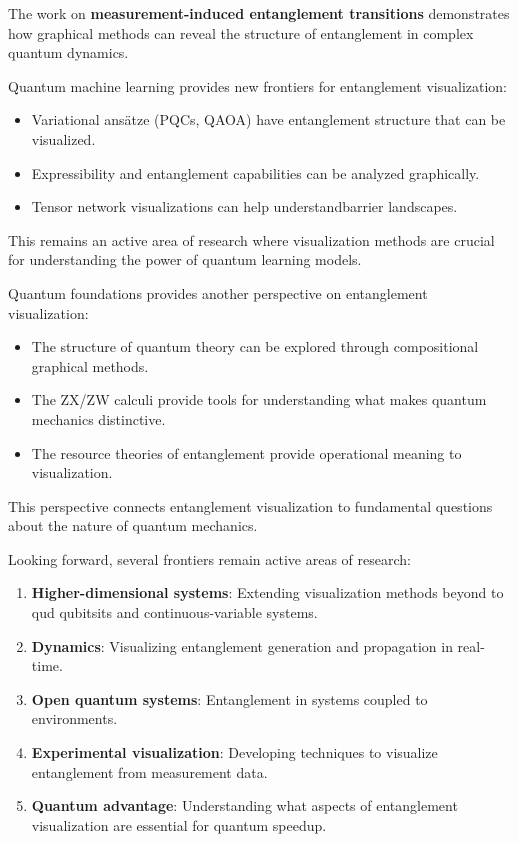 \documentclass[12pt,a4paper]{article}
\begin{document}
The work on \textbf{measurement-induced entanglement transitions} \cite{SpanningGraphs2025} demonstrates how graphical methods can reveal the structure of entanglement in complex quantum dynamics.

Quantum machine learning provides new frontiers for entanglement visualization:
\begin{itemize}
	\item Variational ansätze (PQCs, QAOA) have entanglement structure that can be visualized.
	\item Expressibility and entanglement capabilities can be analyzed graphically.
	\item Tensor network visualizations can help understandbarrier landscapes.
\end{itemize}

This remains an active area of research where visualization methods are crucial for understanding the power of quantum learning models.

Quantum foundations provides another perspective on entanglement visualization:
\begin{itemize}
	\item The structure of quantum theory can be explored through compositional graphical methods.
	\item The ZX/ZW calculi provide tools for understanding what makes quantum mechanics distinctive.
	\item The resource theories of entanglement provide operational meaning to visualization.
\end{itemize}

This perspective connects entanglement visualization to fundamental questions about the nature of quantum mechanics.

Looking forward, several frontiers remain active areas of research:

\begin{enumerate}
	\item \textbf{Higher-dimensional systems}: Extending visualization methods beyond to qud qubitsits and continuous-variable systems.
	\item \textbf{Dynamics}: Visualizing entanglement generation and propagation in real-time.
	\item \textbf{Open quantum systems}: Entanglement in systems coupled to environments.
	\item \textbf{Experimental visualization}: Developing techniques to visualize entanglement from measurement data.
	\item \textbf{Quantum advantage}: Understanding what aspects of entanglement visualization are essential for quantum speedup.
\end{enumerate}
\end{document}
